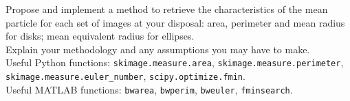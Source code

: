 \documentclass{article}
\begin{document}
Propose and implement a method to retrieve the characteristics of the mean particle for each set of images at your disposal: area, perimeter and mean radius for disks; mean equivalent radius for ellipses. \\

Explain your methodology and any assumptions you may have to make.\\


Useful Python functions: \texttt{skimage.measure.area}, \texttt{skimage.measure.perimeter}, \texttt{skimage.measure.euler\_number}, \texttt{scipy.optimize.fmin}.\\

Useful MATLAB functions: \texttt{bwarea}, \texttt{bwperim}, \texttt{bweuler}, \texttt{fminsearch}.
\end{document}
